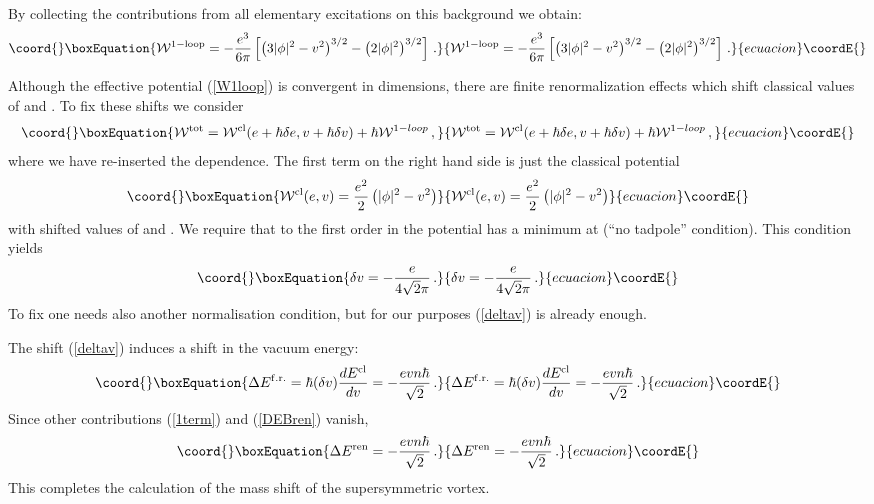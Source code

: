 \documentclass[a4paper,12pt]{article}
\begin{document}
By collecting the contributions from all elementary excitations on
this background we obtain:
\begin{equation}\coord{}\boxEquation{
{\cal W}^{\rm 1-loop} = -\frac{e^3}{6\pi} \left[ \left( 3|\phi |^2
-v^2 \right)^{3/2} -\left( 2|\phi |^2 \right)^{3/2} \right]
\,.\label{W1loop}
}{
{\cal W}^{\rm 1-loop} = -\frac{e^3}{6\pi} \left[ \left( 3|\phi |^2
-v^2 \right)^{3/2} -\left( 2|\phi |^2 \right)^{3/2} \right]
\,.}{ecuacion}\coordE{}\end{equation}

Although the effective potential (\ref{W1loop}) is convergent
in \coordHE{} dimensions, there are finite renormalization effects
which shift classical values of \coordHE{} and \coordHE{}. To fix these shifts
we consider
\begin{equation}\coord{}\boxEquation{
{\cal W}^{\rm tot}={\cal W}^{\rm cl}(e+\hbar \delta e,v +\hbar\delta v)
+\hbar {\cal W}^{1-loop} \,,\label{Wtot} 
}{
{\cal W}^{\rm tot}={\cal W}^{\rm cl}(e+\hbar \delta e,v +\hbar\delta v)
+\hbar {\cal W}^{1-loop} \,,}{ecuacion}\coordE{}\end{equation}
where we have re-inserted the \myHighlight{$\hbar$}\coordHE{} dependence. The first term
on the right hand side is just the classical potential 
\begin{equation}\coord{}\boxEquation{
{\cal W}^{\rm cl}(e,v)=\frac{e^2}2 \left( |\phi |^2 -v^2 \right) 
\label{Wclass}
}{
{\cal W}^{\rm cl}(e,v)=\frac{e^2}2 \left( |\phi |^2 -v^2 \right) 
}{ecuacion}\coordE{}\end{equation}
with shifted values of \coordHE{} and \coordHE{}. We require that to the first
order in \myHighlight{$\hbar$}\coordHE{} the potential \coordHE{} has a minimum
at \coordHE{} (``no tadpole'' condition). This condition yields
\begin{equation}\coord{}\boxEquation{
\delta v = -\frac{e}{4\sqrt{2}\pi}\,.\label{deltav}
}{
\delta v = -\frac{e}{4\sqrt{2}\pi}\,.}{ecuacion}\coordE{}\end{equation}
To fix \coordHE{} one needs also another normalisation condition,
but for our purposes (\ref{deltav}) is already enough.

The shift (\ref{deltav}) induces a shift in the vacuum energy:
\begin{equation}\coord{}\boxEquation{
\Delta E^{\rm f.r.}=\hbar (\delta v)\frac{dE^{\rm cl}}{dv}=
-\frac{evn\hbar}{\sqrt{2}} \,.\label{DEfr}
}{
\Delta E^{\rm f.r.}=\hbar (\delta v)\frac{dE^{\rm cl}}{dv}=
-\frac{evn\hbar}{\sqrt{2}} \,.}{ecuacion}\coordE{}\end{equation}
Since other contributions (\ref{1term}) and (\ref{DEBren}) vanish,
\begin{equation}\coord{}\boxEquation{
\Delta E^{\rm ren}=-\frac{evn\hbar}{\sqrt{2}} \,.\label{finres}
}{
\Delta E^{\rm ren}=-\frac{evn\hbar}{\sqrt{2}} \,.}{ecuacion}\coordE{}\end{equation}
This completes the calculation of the mass shift of the supersymmetric
vortex.
\end{document}
